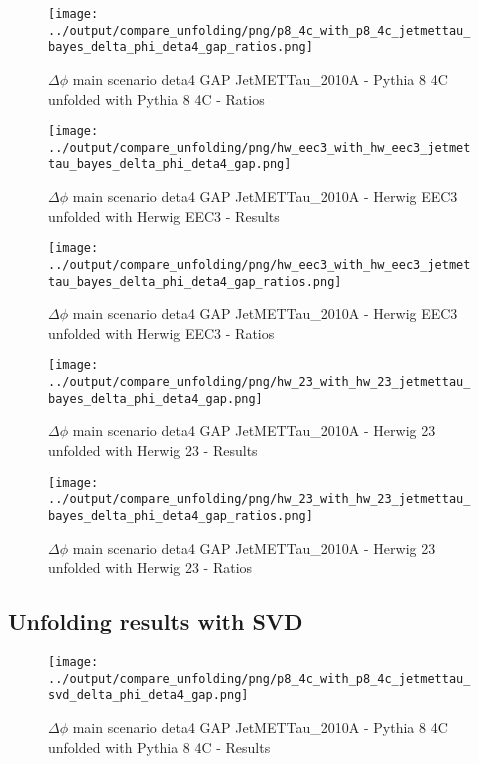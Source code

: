 \documentclass[11pt]{book}
\begin{document}
\begin{figure}[ht]
\centering
\texttt{[image: ../output/compare\_unfolding/png/p8\_4c\_with\_p8\_4c\_jetmettau\_bayes\_delta\_phi\_deta4\_gap\_ratios.png]}
\caption{$\Delta\phi$ main scenario deta4 GAP JetMETTau\_2010A - Pythia 8 4C unfolded with Pythia 8 4C - Ratios}
\label{p8_p8_jetmettau_bayes_delta_phi_deta4_gap_b}
\end{figure}

\begin{figure}[ht]
\centering
\texttt{[image: ../output/compare\_unfolding/png/hw\_eec3\_with\_hw\_eec3\_jetmettau\_bayes\_delta\_phi\_deta4\_gap.png]}
\caption{$\Delta\phi$ main scenario deta4 GAP JetMETTau\_2010A - Herwig EEC3 unfolded with Herwig EEC3 - Results}
\label{hw_eec3_hw_eec3_jetmettau_bayes_delta_phi_deta4_gap_a}
\end{figure}

\begin{figure}[ht]
\centering
\texttt{[image: ../output/compare\_unfolding/png/hw\_eec3\_with\_hw\_eec3\_jetmettau\_bayes\_delta\_phi\_deta4\_gap\_ratios.png]}
\caption{$\Delta\phi$ main scenario deta4 GAP JetMETTau\_2010A - Herwig EEC3 unfolded with Herwig EEC3 - Ratios}
\label{hw_eec3_hw_eec3_jetmettau_bayes_delta_phi_deta4_gap_b}
\end{figure}

\begin{figure}[ht]
\centering
\texttt{[image: ../output/compare\_unfolding/png/hw\_23\_with\_hw\_23\_jetmettau\_bayes\_delta\_phi\_deta4\_gap.png]}
\caption{$\Delta\phi$ main scenario deta4 GAP JetMETTau\_2010A - Herwig 23 unfolded with Herwig 23 - Results}
\label{hw_23_hw_23_jetmettau_bayes_delta_phi_deta4_gap_a}
\end{figure}

\begin{figure}[ht]
\centering
\texttt{[image: ../output/compare\_unfolding/png/hw\_23\_with\_hw\_23\_jetmettau\_bayes\_delta\_phi\_deta4\_gap\_ratios.png]}
\caption{$\Delta\phi$ main scenario deta4 GAP JetMETTau\_2010A - Herwig 23 unfolded with Herwig 23 - Ratios}
\label{hw_23_hw_23_jetmettau_bayes_delta_phi_deta4_gap_b}
\end{figure}

\clearpage
\subsection{Unfolding results with SVD}

\begin{figure}[ht]
\centering
\texttt{[image: ../output/compare\_unfolding/png/p8\_4c\_with\_p8\_4c\_jetmettau\_svd\_delta\_phi\_deta4\_gap.png]}
\caption{$\Delta\phi$ main scenario deta4 GAP JetMETTau\_2010A - Pythia 8 4C unfolded with Pythia 8 4C - Results}
\label{p8_p8_jetmettau_svd_delta_phi_deta4_gap_a}
\end{figure}
\end{document}
